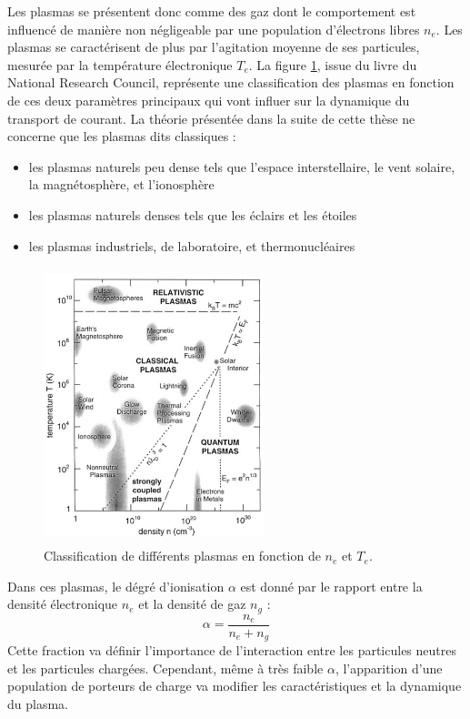 Les plasmas se présentent donc comme des gaz dont le comportement est influencé de manière 
non négligeable par une population d'électrons libres $n_e$. 
Les plasmas se caractérisent de plus par l'agitation moyenne
de ses particules, mesurée par la température électronique $T_e$. 
La figure \ref{zoologie}, issue du livre du National Research
Council\cite{national1995Plasma}, représente une classification des plasmas en
fonction de ces deux paramètres principaux qui vont influer sur la dynamique du
transport de courant.
La théorie présentée dans la suite de cette thèse ne concerne que les plasmas
dits classiques :
			\begin{itemize}
			  \item les plasmas naturels peu dense tels que l'espace interstellaire,
			  le vent solaire, la magnétosphère, et l'ionosphère
			  \item les plasmas naturels denses tels que les éclairs et les étoiles
			  \item les plasmas industriels, de laboratoire, et thermonucléaires
			\end{itemize}
			\begin{figure}[htbp]
				\centering
				\includegraphics[height=80mm,width=64mm]{figures/zoologie.png}{\caption{Classification
				de différents plasmas en fonction de $n_e$ et $T_e$.}\label{zoologie}}
			\end{figure}
			
			Dans ces plasmas, le dégré d'ionisation $\alpha$ est donné par le rapport
			entre la densité électronique $n_e$ et la densité de gaz $n_g$ :
			\begin{equation}
				\alpha=\frac{n_e}{n_e+n_g}
			\end{equation}
			Cette fraction va définir l'importance de l'interaction entre les particules 
			neutres et les particules chargées. Cependant, même à très faible $\alpha$,
			l'apparition d'une population de porteurs de charge va modifier les caractéristiques et la
			dynamique du plasma. 
			
